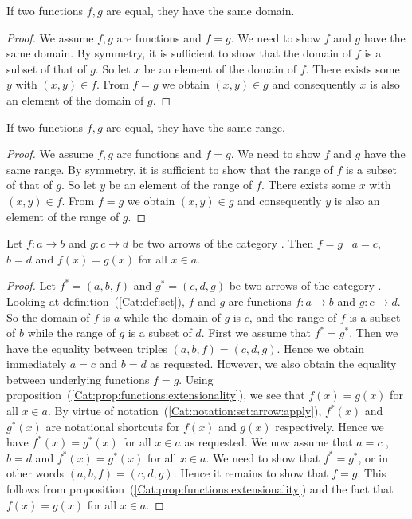 \begin{prop}\label{Cat:prop:functions:equal:domain}
    If two functions $f,g$ are equal, they have the same domain.
\end{prop}
\begin{proof}
    We assume $f,g$ are functions and $f=g$. We need to show $f$ and
    $g$ have the same domain. By symmetry, it is sufficient to show
    that the domain of $f$ is a subset of that of $g$. So let $x$
    be an element of the domain of $f$. There exists some $y$ with
    $(x,y)\in f$. From $f=g$ we obtain $(x,y)\in g$ and consequently
    $x$ is also an element of the domain of $g$.
\end{proof}


\begin{prop}\label{Cat:prop:functions:equal:range}
    If two functions $f,g$ are equal, they have the same range.
\end{prop}
\begin{proof}
    We assume $f,g$ are functions and $f=g$. We need to show $f$ and
    $g$ have the same range. By symmetry, it is sufficient to show
    that the range of $f$ is a subset of that of $g$. So let $y$
    be an element of the range of $f$. There exists some $x$ with
    $(x,y)\in f$. From $f=g$ we obtain $(x,y)\in g$ and consequently
    $y$ is also an element of the range of $g$.
\end{proof}

\begin{prop}\label{Cat:prop:set:arrow:equal}
    Let $f:a\to b$ and $g:c\to d$ be two arrows of the category \Set. Then 
    $f=g$ \ifand\ $a=c$, $b=d$ and $f(x)=g(x)$ for all $x\in a$.
\end{prop}
\begin{proof}
    Let $f^{*}=(a,b,f)$ and $g^{*}=(c,d,g)$ be two arrows
    of the category \Set. Looking at definition~(\ref{Cat:def:set}), $f$
    and $g$ are functions $f:a\to b$ and $g:c\to d$. So the domain of
    $f$ is $a$ while the domain of $g$ is $c$, and the range of $f$
    is a subset of $b$ while the range of $g$ is a subset of $d$.
    First we assume that $f^{*}=g^{*}$. Then we have the equality
    between triples $(a,b,f)=(c,d,g)$. Hence we obtain immediately
    $a=c$ and $b=d$ as requested. However, we also obtain the equality
    between underlying functions $f=g$. Using 
    proposition~(\ref{Cat:prop:functions:extensionality}), we see
    that $f(x)=g(x)$ for all $x\in a$. By virtue of
    notation~(\ref{Cat:notation:set:arrow:apply}), $f^{*}(x)$ and 
    $g^{*}(x)$ are notational shortcuts for $f(x)$ and $g(x)$ 
    respectively. Hence we have $f^{*}(x)=g^{*}(x)$ for all $x\in a$
    as requested. We now assume that $a=c$ , $b=d$ and $f^{*}(x)=g^{*}(x)$
    for all $x\in a$. We need to show that $f^{*}=g^{*}$, or in other
    words $(a,b,f)=(c,d,g)$. Hence it remains to show that $f=g$. This
    follows from proposition~(\ref{Cat:prop:functions:extensionality}) and
    the fact that $f(x)=g(x)$ for all $x\in a$.
\end{proof}

